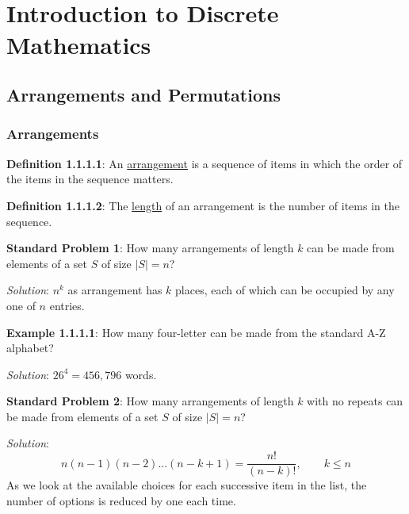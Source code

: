 \documentclass{article}
\title{\thetitle\\[0.5em]\large{\thesubtitle}}
\author{\theauthor}
\date{\thedate}
\newcommand{\separate}[1] {\vspace{#1 pt}\noindent}
\newcommand{\definition}[2]{\textbf{Definition #1}: #2\label{def:#1}}
\newcommand{\example}[2]{\textbf{Example #1}: #2\label{ex:#1}}
\newcommand{\standardproblem}[3]{\textbf{Standard Problem #1}: #2 \par\separate{3}\textit{Solution}: #3\label{prob:#1}}
\begin{document}
\maketitle\thispagestyle{empty} %
\setcounter{tocdepth}{2}
\newpage\tableofcontents %

\clearpage\setcounter{page}{1}\newpage %
\pagestyle{fancy}





\section{Introduction to Discrete Mathematics}

\subsection{Arrangements and Permutations}

\subsubsection{Arrangements}

\definition{1.1.1.1}{An \underline{arrangement} is a sequence of items in which the order of the items in the sequence matters.}

\separate{7}\definition{1.1.1.2}{The \underline{length} of an arrangement is the number of items in the sequence.}

\separate{7}\standardproblem{1}{How many arrangements of length \(k\) can be made from elements of a set \(S\) of size \(|S|=n\)?}
{\(n^k\) as arrangement has \(k\) places, each of which can be occupied by any one of \(n\) entries.}

\separate{7}\example{1.1.1.1}{How many four-letter  can be made from the standard A-Z alphabet?

\separate{3}\textit{Solution}: \(26^4 = 456,796\) words.}

\separate{7}\standardproblem{2}{How many arrangements of length \(k\) with no repeats can be made from elements of a set \(S\) of size \(|S|=n\)?}
{\begin{equation} 
    n(n-1)(n-2)...(n-k+1) = \frac{n!}{(n-k)!},\qquad k \leq n    
\end{equation}
As we look at the available choices for each successive item in the list, the number of options is reduced by one each time.}
\end{document}

